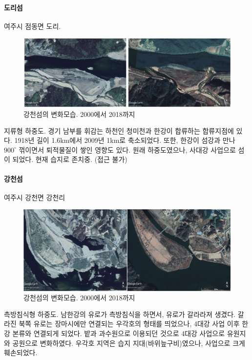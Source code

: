 \paragraph{도리섬}
여주시 점동면 도리.

\begin{figure}[ht]
    \centering
    \includegraphics[width=.8\textwidth]{img/도리섬.JPG}
    \caption{강천섬의 변화모습. 2000에서 2018까지 }
    \label{fig:my_labe611}
\end{figure}

지류형 하중도. 경기 남부를 휘감는 하천인 청미천과 한강이 합류하는 합류지점에 있다. 1918년 길이 1.6km에서 2009년 1km로 축소되었다.
또한, 한강이 섬강과 만나 $900^\circ$ 꺾이면서 퇴적물질이 쌓인 영향도 있다.
원래 하중도였으나, 사대강 사업으로 섬이 되었다. 현재 습지로 존치중. (접근 불가)

\paragraph{강천섬}
여주시 강천면 강천리

\begin{figure}[ht]
    \centering
    \includegraphics[width=.8\textwidth]{img/강천섬.jpg}
    \caption{강천섬의 변화모습. 2000에서 2018까지 }
    \label{fig:my_labe612}
\end{figure}

측방침식형 하중도. 남한강의 유로가 측방침식을 하면서, 유로가 갈라라져 생겼다.
갈라진 북쪽 유로는 장마시에만 연결되는 우각호의 형태를 띄었으나, 4대강 사업 이후 한강 본류와 연결되게 되었다.
밭과 과수원으로 이용되던 것으로 4대강 사업으로 유원지와 공원으로 변화하였다.
우각호 지역은 습지 지대(바위늪구비)였으나, 사업으로 크게 훼손되었다.

